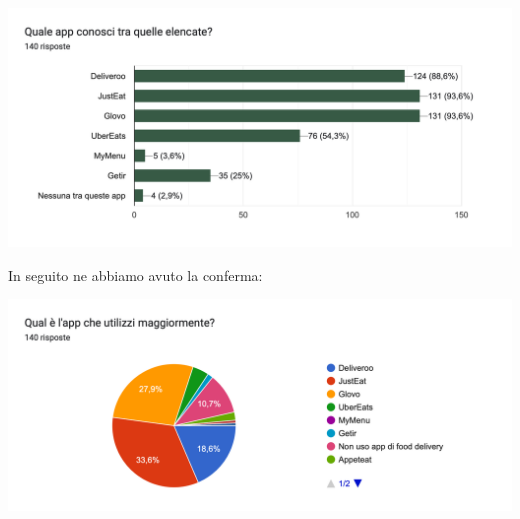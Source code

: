 \documentclass{article}
\begin{document}
\begin{center}
   \includegraphics[width=\textwidth]{Data/Grafici/App_competitor.png} 
\end{center}
\par In seguito ne abbiamo avuto la conferma:
\begin{center}
    \includegraphics[width=\textwidth]{Data/Grafici/App_competitor_utilizzate.png}
\end{center}


    \vspace{1cm}
\end{document}
